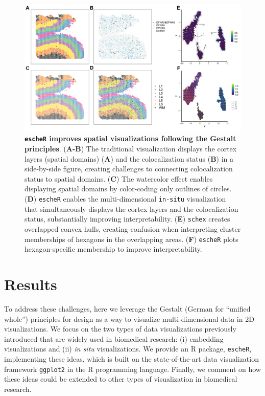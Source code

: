 \documentclass[10pt,twocolumn]{article}
\begin{document}
\begin{figure}[!t]
\begin{center}
\includegraphics[width=\textwidth]{Manuscript/figure/fig_grid.png}
\caption{\small \textbf{\texttt{escheR} improves spatial visualizations following the Gestalt principles}. (\textbf{A-B}) The traditional visualization displays the cortex layers (spatial domains) (\textbf{A}) and the colocalization status (\textbf{B}) in a side-by-side figure, creating challenges to connecting colocalization status to spatial domains. (\textbf{C}) The watercolor effect enables displaying spatial domains by color-coding only outlines of circles. (\textbf{D}) \texttt{escheR} enables the multi-dimensional \texttt{in-situ} visualization that simultaneously displays the cortex layers and the colocalization status, substantially improving interpretability. (\textbf{E}) \texttt{schex} creates overlapped convex hulls, creating confusion when interpreting cluster memberships of hexagons in the overlapping areas. (\textbf{F}) \texttt{escheR} plots hexagon-specific membership to improve interpretability.}
\label{fig:visual} 
\end{center}
\end{figure}


\section{Results}

To address these challenges, here we leverage the Gestalt (German for “unified whole”) principles for design \cite{todorovic_2008, palmer_1999} as a way to visualize multi-dimensional data in 2D visualizations. We focus on the two types of data visualizations previously introduced that are widely used in biomedical research: (i) embedding visualizations and (ii) \textit{in situ} visualizations. We provide an R package, \texttt{escheR}, implementing these ideas, which is built on the state-of-the-art data visualization framework \texttt{ggplot2} in the R programming language. Finally, we comment on how these ideas could be extended to other types of visualization in biomedical research. 
\end{document}
